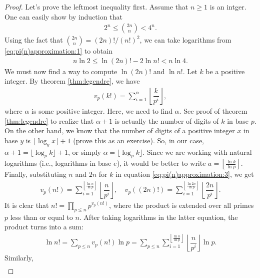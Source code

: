 	\begin{proof}
		Let's prove the leftmost inequality first. Assume that $n \geq 1$ is an intger. One can easily show by induction that
		\begin{align}
		\label{eq:pi(n)approximation:1}
		2^n \leq \binom{2n}{n} < 4^n.
		\end{align}
		Using the fact that $\binom{2n}{n} = (2n)!/(n!)^2$, we can take logarithms from \eqref{eq:pi(n)approximation:1} to obtain
		\begin{align}
		\label{eq:pi(n)approximation:2}
		n \ln 2 \leq \ln (2n)! - 2 \ln n! < n \ln 4.
		\end{align}
		We must now find a way to compute $\ln(2n)!$ and $\ln n!$. Let $k$ be a positive integer. By theorem \eqref{thm:legendre}, we have
		\begin{align}
		\label{eq:pi(n)approximation:3}
		v_p(k!) = \sum_{i=1}^{\alpha}\left\lfloor\dfrac{k}{p^i}\right\rfloor,
		\end{align} 
		where $\alpha$ is some positive integer. Here, we need to find $\alpha$. See proof of theorem \eqref{thm:legendre} to realize that $\alpha+1$ is actually the number of digits of $k$ in base $p$. On the other hand, we know that the number of digits of a positive integer $x$ in base $y$ is $\lfloor\log_y x\rfloor+1$ (prove this as an exercise). So, in our case, $\alpha+1=\lfloor\log_p k\rfloor+1$, or simply $\alpha = \lfloor\log_p k\rfloor$. Since we are working with natural logarithms (i.e., logarithms in base $e$), it would be better to write $a = \left\lfloor \frac{\ln k}{\ln p}\right\rfloor$. Finally, substituting $n$ and $2n$ for $k$ in equation \eqref{eq:pi(n)approximation:3}, we get
			\begin{align*}
				v_p(n!) = \sum_{i=1}^{\left\lfloor \frac{\ln n}{\ln p}\right\rfloor}\left\lfloor\dfrac{n}{p^i}\right\rfloor, \quad v_p\left((2n)!\right) = \sum_{i=1}^{\left\lfloor \frac{\ln 2n}{\ln p}\right\rfloor}\left\lfloor\dfrac{2n}{p^i}\right\rfloor.
			\end{align*}
		It is clear that $n! = \prod\limits_{p\leq n} p^{v_p(n!)}$, where the product is extended over all primes $p$ less than or equal to $n$. After taking logarithms in the latter equation, the product turns into a sum:
			\begin{align*}
			\ln n! = \sum_{p \leq n} v_p(n!) \ln p = \sum_{p \leq n}  \sum_{i=1}^{\left\lfloor \frac{\ln n}{\ln p}\right\rfloor}\left\lfloor\dfrac{n}{p^i}\right\rfloor \ln p.
			\end{align*}
		Similarly,
			\begin{align*}

\end{align*}
\end{proof}
